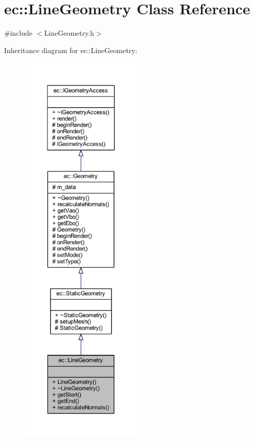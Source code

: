 \hypertarget{classec_1_1_line_geometry}{}\section{ec\+:\+:Line\+Geometry Class Reference}
\label{classec_1_1_line_geometry}


{\ttfamily \#include $<$Line\+Geometry.\+h$>$}



Inheritance diagram for ec\+:\+:Line\+Geometry\+:\nopagebreak
\begin{figure}[H]
\begin{center}
\leavevmode
\includegraphics[height=550pt]{classec_1_1_line_geometry__inherit__graph}
\end{center}
\end{figure}


